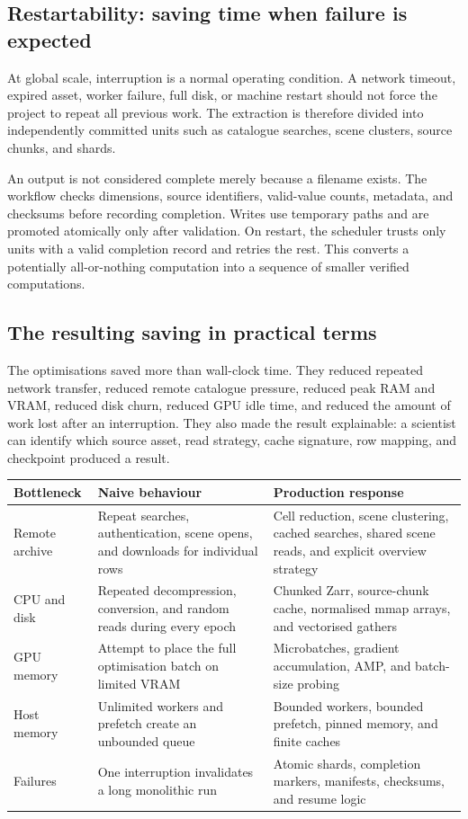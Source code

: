\documentclass[12pt,a4paper]{report}
\begin{document}
\subsection{Restartability: saving time when failure is expected}
At global scale, interruption is a normal operating condition. A network
timeout, expired asset, worker failure, full disk, or machine restart should
not force the project to repeat all previous work. The extraction is therefore
divided into independently committed units such as catalogue searches, scene
clusters, source chunks, and shards.

An output is not considered complete merely because a filename exists. The
workflow checks dimensions, source identifiers, valid-value counts, metadata,
and checksums before recording completion. Writes use temporary paths and are
promoted atomically only after validation. On restart, the scheduler trusts
only units with a valid completion record and retries the rest. This converts a
potentially all-or-nothing computation into a sequence of smaller verified
computations.

\subsection{The resulting saving in practical terms}
The optimisations saved more than wall-clock time. They reduced repeated
network transfer, reduced remote catalogue pressure, reduced peak RAM and VRAM,
reduced disk churn, reduced GPU idle time, and reduced the amount of work lost
after an interruption. They also made the result explainable: a scientist can
identify which source asset, read strategy, cache signature, row mapping, and
checkpoint produced a result.

\begin{center}
\begin{tabular}{p{}p{}p{}}
\toprule
\textbf{Bottleneck} & \textbf{Naive behaviour} & \textbf{Production response}\\
\midrule
Remote archive & Repeat searches, authentication, scene opens, and downloads
for individual rows & Cell reduction, scene clustering, cached searches,
shared scene reads, and explicit overview strategy\\
CPU and disk & Repeated decompression, conversion, and random reads during
every epoch & Chunked Zarr, source-chunk cache, normalised mmap arrays, and
vectorised gathers\\
GPU memory & Attempt to place the full optimisation batch on limited VRAM &
Microbatches, gradient accumulation, AMP, and batch-size probing\\
Host memory & Unlimited workers and prefetch create an unbounded queue &
Bounded workers, bounded prefetch, pinned memory, and finite caches\\
Failures & One interruption invalidates a long monolithic run & Atomic shards,
completion markers, manifests, checksums, and resume logic\\
\bottomrule
\end{tabular}
\end{center}
\end{document}
